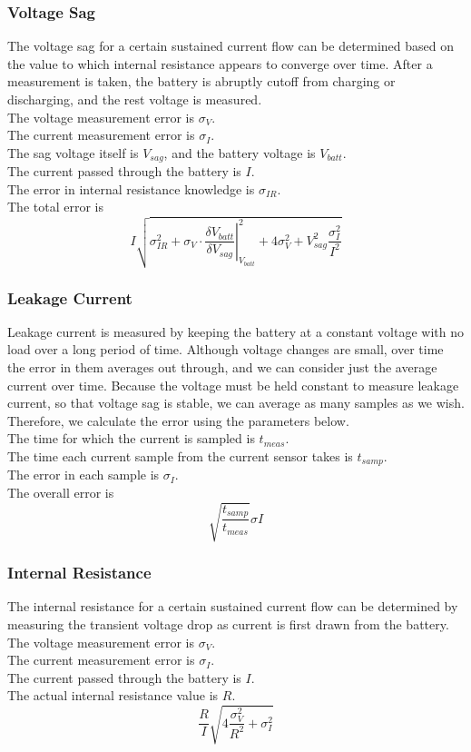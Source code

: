 \documentclass{article}
\begin{document}
\subsubsection{Voltage Sag}
The voltage sag for a certain sustained current flow can be determined based on the value to which internal resistance appears to converge over time. After a measurement is taken, the battery is abruptly cutoff from charging or discharging, and the rest voltage is measured.\\
The voltage measurement error is $\sigma_V$.\\
The current measurement error is $\sigma_I$.\\
The sag voltage itself is $V_{sag}$, and the battery voltage is $V_{batt}$.\\
The current passed through the battery is $I$.\\
The error in internal resistance knowledge is $\sigma_{IR}$.\\
The total error is
$$I\sqrt{\sigma_{IR}^2 + \sigma_V\cdot\left.\frac{\delta V_{batt}}{\delta V_{sag}}\right\vert_{V_{batt}}^2 + 4\sigma_V^2 + V_{sag}^2\frac{\sigma_I^2}{I^2}}$$
\subsubsection{Leakage Current}
Leakage current is measured by keeping the battery at a constant voltage with no load over a long period of time. Although voltage changes are small, over time the error in them averages out through, and we can consider just the average current over time. Because the voltage must be held constant to measure leakage current, so that voltage sag is stable, we can average as many samples as we wish. Therefore, we calculate the error using the parameters below.\\
The time for which the current is sampled is $t_{meas}$.\\
The time each current sample from the current sensor takes is $t_{samp}$.\\
The error in each sample is $\sigma_{I}$.\\
The overall error is
$$\sqrt{\frac{t_{samp}}{t_{meas}}}\sigma{I}$$
\subsubsection{Internal Resistance}
The internal resistance for a certain sustained current flow can be determined by measuring the transient voltage drop as current is first drawn from the battery.\\
The voltage measurement error is $\sigma_V$.\\
The current measurement error is $\sigma_I$.\\
The current passed through the battery is $I$.\\
The actual internal resistance value is $R$.\\
$$\frac{R}{I}\sqrt{4\frac{\sigma_V^2}{R^2} + \sigma_I^2}$$
\end{document}

